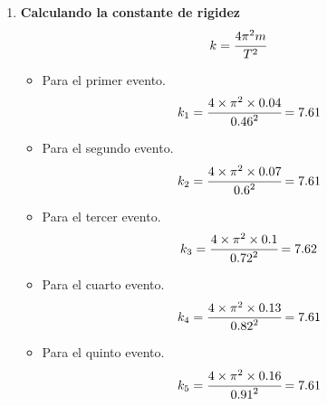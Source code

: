 \begin{enumerate}[label=\bfseries\alph*.-,itemsep=2pt]
	\item \textbf{Calculando la constante de rigidez}
	      \[k= \cfrac{4\pi^2 m}{T^2}\]


	      \begin{itemize}[label=\textbf{$\bullet$},itemsep=2pt,partopsep=6pt]
		      \item Para el primer evento.
		            \[k_1= \cfrac{4\times\pi^2\times{0.04}}{{0.46}^2}=7.61\]
		      \item Para el segundo evento.
		            \[k_2= \cfrac{4\times\pi^2\times{0.07}}{{0.6}^2}=7.61\]
		      \item Para el tercer evento.
		            \[k_3= \cfrac{4\times\pi^2\times{0.1}}{{0.72}^2}=7.62\]
		      \item Para el cuarto evento.
		            \[k_4= \cfrac{4\times\pi^2\times{0.13}}{{0.82}^2}=7.61\]
		      \item Para el quinto evento.
		            \[k_5= \cfrac{4\times\pi^2\times{0.16}}{{0.91}^2}=7.61\]
	      \end{itemize}
\end{enumerate}

